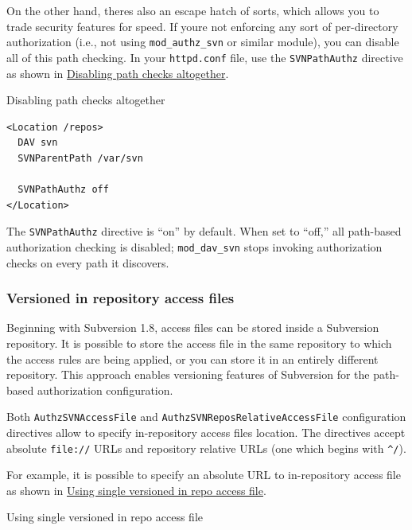 On the other hand, there\textquotesingle s also an escape hatch of
sorts, which allows you to trade security features for speed. If
you\textquotesingle re not enforcing any sort of per-directory
authorization (i.e., not using \texttt{mod\_authz\_svn} or similar
module), you can disable all of this path checking. In your
\texttt{httpd.conf} file, use the \texttt{SVNPathAuthz} directive as
shown in
\hyperref[svn.serverconfig.httpd.authz.pathauthzoff.ex-1]{Disabling path
checks altogether}.

\protect{}\label{svn.serverconfig.httpd.authz.pathauthzoff.ex-1}
Disabling path checks altogether

\begin{verbatim}
<Location /repos>
  DAV svn
  SVNParentPath /var/svn

  SVNPathAuthz off
</Location>
\end{verbatim}

The \texttt{SVNPathAuthz} directive is ``on'' by default. When set to
``off,'' all path-based authorization checking is disabled;
\texttt{mod\_dav\_svn} stops invoking authorization checks on every path
it discovers.

\subsubsection{Versioned in repository access
files}\label{svn.serverconfig.httpd.authz.inrepo-authz}

Beginning with Subversion 1.8, access files can be stored inside a
Subversion repository. It is possible to store the access file in the
same repository to which the access rules are being applied, or you can
store it in an entirely different repository. This approach enables
versioning features of Subversion for the path-based authorization
configuration.

Both \texttt{AuthzSVNAccessFile} and
\texttt{AuthzSVNReposRelativeAccessFile} configuration directives allow
to specify in-repository access file\textquotesingle s location. The
directives accept absolute \texttt{file://} URLs and repository relative
URLs (one which begins with \texttt{\^{}/}).

For example, it is possible to specify an absolute URL to in-repository
access file as shown in
\hyperref[svn.serverconfig.httpd.authz.inrepo-authz.ex-1]{Using single
versioned in repo access file}.

\protect{}\label{svn.serverconfig.httpd.authz.inrepo-authz.ex-1}
Using single versioned in repo access file


